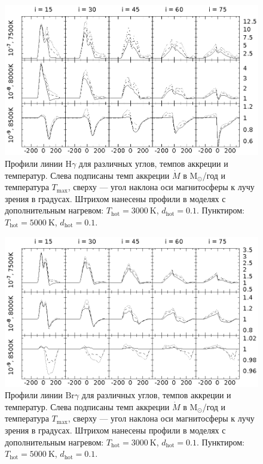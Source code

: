 \documentclass{article}
\begin{document}
\begin{figure}[h]
\centering
\includegraphics[width=\textwidth]{hot_5_Hg.eps}
\caption{Профили линии $\text{H}\gamma$ для различных углов, темпов аккреции и температур. Слева подписаны темп аккреции $\dot{M}$ в $\text{M}_\odot$/год и температура $T_\text{max}$, сверху --- угол наклона оси магнитосферы к лучу зрения в градусах. Штрихом нанесены профили в моделях с дополнительным нагревом: $T_\text{hot} = 3000\ \text{K}$, $d_\text{hot} = 0.1$. Пунктиром: $T_\text{hot} = 5000\ \text{K}$, $d_\text{hot} = 0.1$.}
\label{fig:Hg}
\end{figure}

\begin{figure}[h]
\centering
\includegraphics[width=\textwidth]{hot_5_Brg.eps}
\caption{Профили линии $\text{Br}\gamma$ для различных углов, темпов аккреции и температур. Слева подписаны темп аккреции $\dot{M}$ в $\text{M}_\odot$/год и температура $T_\text{max}$, сверху --- угол наклона оси магнитосферы к лучу зрения в градусах. Штрихом нанесены профили в моделях с дополнительным нагревом: $T_\text{hot} = 3000\ \text{K}$, $d_\text{hot} = 0.1$. Пунктиром: $T_\text{hot} = 5000\ \text{K}$, $d_\text{hot} = 0.1$.}
\label{fig:Brg}
\end{figure}
\FloatBarrier
\end{document}
